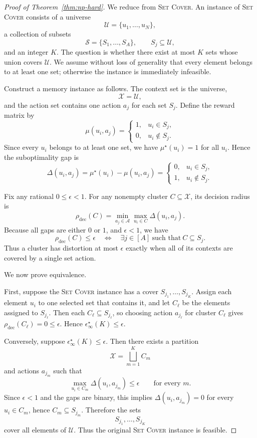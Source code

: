 \documentclass{article}
\theoremstyle{plain}
\theoremstyle{definition}
\theoremstyle{remark}
\newcommand{\cA}{\mathcal{A}}
\newcommand{\cX}{\mathcal{X}}
\newcommand{\eps}{\epsilon}
\begin{document}
\begin{proof}[Proof of Theorem~\ref{thm:np-hard}]
We reduce from \textsc{Set Cover}. An instance of \textsc{Set Cover}
consists of a universe
\[
\mathcal U=\{u_1,\dots,u_N\},
\]
a collection of subsets
\[
\mathcal S=\{S_1,\dots,S_A\}, \qquad S_j\subseteq \mathcal U,
\]
and an integer \(K\). The question is whether there exist at most \(K\)
sets whose union covers \(\mathcal U\). We assume without loss of
generality that every element belongs to at least one set; otherwise the
instance is immediately infeasible.

Construct a memory instance as follows. The context set is the universe,
\[
\cX=\mathcal U,
\]
and the action set contains one action \(a_j\) for each set \(S_j\). Define
the reward matrix by
\[
\mu(u_i,a_j)
=
\begin{cases}
1, & u_i\in S_j,\\
0, & u_i\notin S_j.
\end{cases}
\]
Since every \(u_i\) belongs to at least one set, we have
\(\mu^\star(u_i)=1\) for all \(u_i\). Hence the suboptimality gap is
\[
\Delta(u_i,a_j)
=
\mu^\star(u_i)-\mu(u_i,a_j)
=
\begin{cases}
0, & u_i\in S_j,\\
1, & u_i\notin S_j.
\end{cases}
\]

Fix any rational \(0\le \eps<1\). For any nonempty cluster
\(C\subseteq\cX\), its decision radius is
\[
\rho_{\mathrm{dec}}(C)
=
\min_{a_j\in\cA}\max_{u_i\in C}\Delta(u_i,a_j).
\]
Because all gaps are either \(0\) or \(1\), and \(\eps<1\), we have
\[
\rho_{\mathrm{dec}}(C)\le \eps
\quad\Longleftrightarrow\quad
\exists j\in[A]\ \text{such that}\ C\subseteq S_j .
\]
Thus a cluster has distortion at most \(\eps\) exactly when all of its
contexts are covered by a single set action.

We now prove equivalence.

First, suppose the \textsc{Set Cover} instance has a cover
\(S_{j_1},\dots,S_{j_K}\). Assign each element \(u_i\) to one selected set
that contains it, and let \(C_\ell\) be the elements assigned to
\(S_{j_\ell}\). Then each \(C_\ell\subseteq S_{j_\ell}\), so choosing action
\(a_{j_\ell}\) for cluster \(C_\ell\) gives
\(\rho_{\mathrm{dec}}(C_\ell)=0\le\eps\). Hence
\(\eps^\star_\infty(K)\le\eps\).

Conversely, suppose \(\eps^\star_\infty(K)\le\eps\). Then there exists a
partition
\[
\cX=\bigsqcup_{m=1}^{K} C_m
\]
and actions \(a_{j_m}\) such that
\[
\max_{u_i\in C_m}\Delta(u_i,a_{j_m})\le\eps
\qquad
\text{for every }m.
\]
Since \(\eps<1\) and the gaps are binary, this implies
\(\Delta(u_i,a_{j_m})=0\) for every \(u_i\in C_m\), hence
\(C_m\subseteq S_{j_m}\). Therefore the sets
\[
S_{j_1},\dots,S_{j_K}
\]
cover all elements of \(\mathcal U\). Thus the original \textsc{Set Cover}
instance is feasible.


\end{proof}
\end{document}
